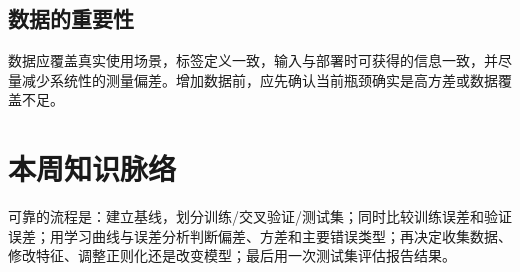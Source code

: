 \subsection{数据的重要性}
\begin{keybox}[高质量数据的条件]
数据应覆盖真实使用场景，标签定义一致，输入与部署时可获得的信息一致，并尽量减少系统性的测量偏差。增加数据前，应先确认当前瓶颈确实是高方差或数据覆盖不足。
\end{keybox}

\section{本周知识脉络}
\begin{keybox}[用诊断驱动工程决策]
可靠的流程是：建立基线，划分训练/交叉验证/测试集；同时比较训练误差和验证误差；用学习曲线与误差分析判断偏差、方差和主要错误类型；再决定收集数据、修改特征、调整正则化还是改变模型；最后用一次测试集评估报告结果。
\end{keybox}

